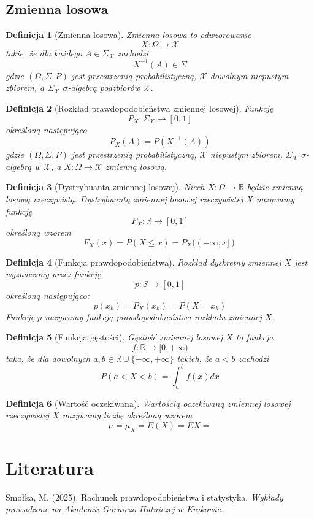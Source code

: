 \documentclass[11pt, leqno]{scrartcl}
\theoremstyle{mydefinition}
\newtheorem{definition}{Definicja}[subsection]
\theoremstyle{mytheorem}
\begin{document}
    \subsection{Zmienna losowa}
    \begin{definition}[Zmienna losowa]
        Zmienna losowa to odwzorowanie
        \[
            X:\Omega \to \mathcal{X}
        \]
        takie, że dla każdego $A \in \Sigma_{\mathcal{X}}$ zachodzi
        \[
            X^{-1}(A) \in \Sigma
        \]
        gdzie $(\Omega,\Sigma,P)$ jest przestrzenią probabilistyczną,
        $\mathcal{X}$ dowolnym niepustym zbiorem, a $\Sigma_{\mathcal{X}}$
        $\sigma$-algebrą podzbiorów $\mathcal{X}$.
    \end{definition}
    \begin{definition}[Rozkład prawdopodobieństwa zmiennej losowej]
        Funkcję
        \[
            P_X:\Sigma_{\mathcal{X}} \to [0,1]
        \]
        określoną następująco
        \[
            P_X(A)=P(X^{-1}(A))
        \]
        gdzie $(\Omega,\Sigma,P)$ jest przestrzenią probabilistyczną,
        $\mathcal{X}$ niepustym zbiorem, $\Sigma_{\mathcal{X}}$
        $\sigma$-algebrą w $\mathcal{X}$, a $X:\Omega \to \mathcal{X}$
        zmienną losową.
    \end{definition}
    \begin{definition}[Dystrybuanta zmiennej losowej]
        Niech $X:\Omega \to \mathbb{R}$ będzie zmienną losową rzeczywistą.
        Dystrybuantą zmiennej losowej rzeczywistej $X$ nazywamy funkcję
        \[
            F_X:\mathbb{R} \to [0,1]
        \]
        określoną wzorem
        \[
            F_X(x)=P(X \leq x)=P_X((-\infty,x])
        \]
    \end{definition}
    \begin{definition}[Funkcja prawdopodobieństwa]
        Rozkład dyskretny zmiennej $X$ jest wyznaczony przez funkcję
        \[
            p:\mathcal{S} \to [0,1]
        \]
        określoną następująco:
        \[
            p(x_k)=P_X(x_k)=P(X=x_k)
        \]
        Funkcję $p$ nazywamy funkcją prawdopodobieństwa rozkładu zmiennej $X$.
    \end{definition}
    \begin{definition}[Funkcja gęstości]
        Gęstość zmiennej losowej $X$ to funkcja
        \[
            f:\mathbb{R} \to [0,+\infty)
        \]
        taka, że dla dowolnych $a,b\in \mathbb{R} \cup \{-\infty,+\infty\}$
        takich, że $a<b$ zachodzi
        \[
            P(a<X<b)=\int_{a}^{b}f(x)dx
        \]
    \end{definition}
    \begin{definition}[Wartość oczekiwana]
        Wartością oczekiwaną zmiennej losowej rzeczywistej $X$ nazywamy
        liczbę określoną wzorem
        \[
            \mu=\mu_X=E(X)=EX=
        \]
    \end{definition}

    \section{Literatura}
    \begin{thebibliography}{9}
         Smołka, M. (2025). Rachunek prawdopodobieństwa
        i statystyka. \textit{Wykłady prowadzone na Akademii Górniczo-Hutniczej
        w Krakowie}.
    \end{thebibliography}
\end{document}
